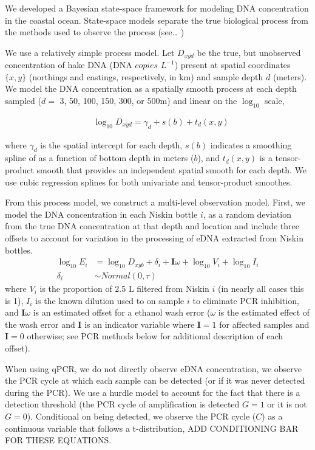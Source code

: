 \documentclass[
]{article}
\begin{document}
We developed a Bayesian state-space framework for modeling DNA
concentration in the coastal ocean. State-space models separate the true
biological process from the methods used to observe the process
(see\ldots{} )

We use a relatively simple process model. Let \(D_{xyd}\) be the true,
but unobserved concentration of hake DNA (DNA \(copies\) \(L^{-1}\))
present at spatial coordinates \(\{x,y\}\) (northings and eastings,
respectively, in km) and sample depth \(d\) (meters). We model the DNA
concentration as a spatially smooth process at each depth sampled
(\(d =\) 3, 50, 100, 150, 300, or 500m) and linear on the \(\log_{10}\)
scale,

\begin{align}
  & \log_{10}D_{xyd}=\gamma_d + s(b) + t_d(x,y)
\end{align}

where \(\gamma_d\) is the spatial intercept for each depth, \(s(b)\)
indicates a smoothing spline of as a function of bottom depth in meters
(\(b\)), and \(t_d(x,y)\) is a tensor-product smooth that provides an
independent spatial smooth for each depth. We use cubic regression
splines for both univariate and tensor-product smoothes.

From this process model, we construct a multi-level observation model.
First, we model the DNA concentration in each Niskin bottle \(i\), as a
random deviation from the true DNA concentration at that depth and
location and include three offsets to account for variation in the
processing of eDNA extracted from Niskin bottles. \begin{align}
  \log_{10}E_{i} &= \log_{10}D_{xyb} + \delta_i + \mathbf{I}\omega + \log_{10}{V_i} + \log_{10}{I_i} \\
  \delta_i & \sim Normal(0,\tau)
\end{align} where \(V_i\) is the proportion of 2.5 L filtered from
Niskin \(i\) (in nearly all cases this is 1), \(I_i\) is the known
dilution used to on sample \(i\) to eliminate PCR inhibition, and
\(\mathbf{I}\omega\) is an estimated offset for a ethanol wash error
(\(\omega\) is the estimated effect of the wash error and \(\mathbf{I}\)
is an indicator variable where \(\mathbf{I}=1\) for affected samples and
\(\mathbf{I}=0\) otherwise; see PCR methods below for additional
description of each offset).

When using qPCR, we do not directly observe eDNA concentration, we
observe the PCR cycle at which each sample can be detected (or if it was
never detected during the PCR). We use a hurdle model to account for the
fact that there is a detection threshold (the PCR cycle of amplification
is detected \(G=1\) or it is not \(G=0\)). Conditional on being
detected, we observe the PCR cycle (\(C\)) as a continuous variable that
follows a t-distribution, ADD CONDITIONING BAR FOR THESE EQUATIONS.
\end{document}
